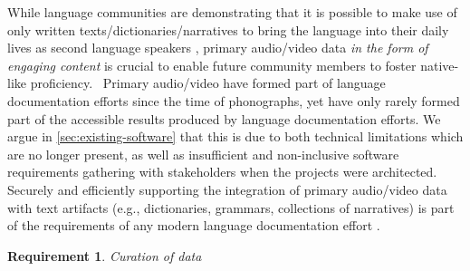 \documentclass[11pt]{article}
\newcommand{\smalltodo}[2][]
    {\todo[caption={#2}, #1]
    {\tiny#2\normalsize}}
\newtheorem{requirement}{Requirement}
\begin{document}
While language communities are demonstrating that it is possible to make use of
only written texts/dictionaries/narratives to bring the language into their
daily lives as second language speakers \cite{Ironstrack:2012}, primary audio/video data \emph{in the
form of engaging content} is crucial to enable future community members to
foster native-like proficiency.%
~Primary audio/video  have formed part of  language documentation efforts since
the time of phonographs, yet have only rarely formed part of the accessible
results produced by language documentation efforts.  We argue in
\autoref{sec:existing-software} that this is  due to both technical limitations
which are no longer present, as well as insufficient and non-inclusive software
requirements gathering with stakeholders when the projects were architected.
Securely and efficiently supporting the integration of primary audio/video data
with text artifacts (e.g., dictionaries, grammars, collections of narratives)
is part of the requirements of any modern language documentation effort
\cite{Schroeter:2006} \cite{Good:2012b}. 




\begin{requirement}
	\label{req:curation}
       Curation of data
\end{requirement}
\end{document}
